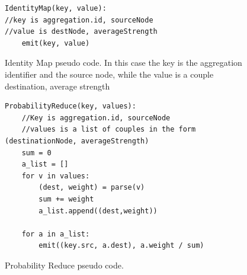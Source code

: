 \begin{figure}[H]
\begin{verbatim}
IdentityMap(key, value):
//key is aggregation.id, sourceNode
//value is destNode, averageStrength
    emit(key, value)
\end{verbatim}
\caption{Identity Map pseudo code. In this case the key is the aggregation identifier and the source node, while the value is a couple destination, average strength}
\label{fig:identitymap}
\end{figure}
\begin{figure}[H]
\begin{verbatim}
ProbabilityReduce(key, values):
	//Key is aggregation.id, sourceNode
	//values is a list of couples in the form (destinationNode, averageStrength)
    sum = 0
    a_list = []
    for v in values:
        (dest, weight) = parse(v)
        sum += weight
        a_list.append((dest,weight))
  
    for a in a_list:
        emit((key.src, a.dest), a.weight / sum)

\end{verbatim}
\caption{Probability Reduce pseudo code.}
\label{fig:probabilityreduce}
\end{figure}
